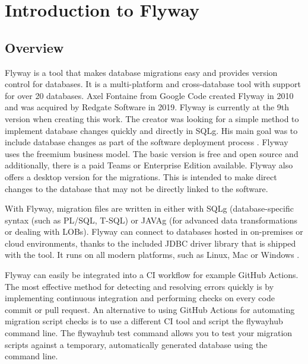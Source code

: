 

\chapter{Introduction to Flyway}


\section{Overview}
%
Flyway is a tool that makes database migrations easy and provides version control for databases. It is a multi-platform and cross-database tool with support for over 20 databases.
Axel Fontaine from Google Code created Flyway in 2010 and was acquired by Redgate Software in 2019. Flyway is currently at the 9th version when creating this work. The creator was looking for a simple method to implement database changes quickly and directly in \gls{SQLg}. His main goal was to include database changes as part of the software deployment process \cite{Robles2021}.
Flyway uses the freemium business model. The basic version is free and open source \cite{Fontaine2010} and additionally, there is a paid Teams or Enterprise Edition available. Flyway also offers a desktop version for the migrations. This is intended to make direct changes to the database that may not be directly linked to the software.

With Flyway, migration files are written in either with \gls{SQLg} (database-specific syntax (such as PL/SQL, T-SQL) or \gls{JAVAg} (for advanced data transformations or dealing with LOBs). Flyway can connect to databases hosted in on-premises or cloud environments, thanks to the included JDBC driver library that is shipped with the tool. It runs on all modern platforms, such as Linux, Mac or Windows \cite{Dillon2022, DBMSTools}.


%
Flyway can easily be integrated into a \gls{CI} workflow for example GitHub Actions. The most effective method for detecting and resolving errors quickly is by implementing continuous integration and performing checks on every code commit or pull request. An alternative to using GitHub Actions for automating migration script checks is to use a different CI tool and script the flywayhub command line. The flywayhub test command allows you to test your migration scripts against a temporary, automatically generated database using the command line.


